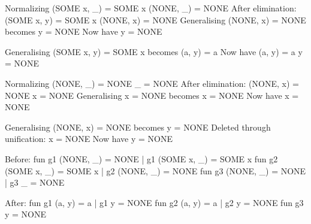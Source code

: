 \begin{example}[]
\begin{narrow}{-3em}{0em}
\begin{multicols}{2}
\begin{sml}
Normalizing
  (SOME x, _) = SOME x
  (NONE, _) = NONE
After elimination:
  (SOME x, y) = SOME x
  (NONE, x) = NONE
Generalising
  (NONE, x) = NONE
becomes
  y = NONE
Now have
  y = NONE

Generalising
  (SOME x, y) = SOME x
becomes
  (a, y) = a
Now have
  (a, y) = a
  y = NONE

Normalizing
  (NONE, _) = NONE
  _ = NONE
After elimination:
  (NONE, x) = NONE
  x = NONE
Generalising
  x = NONE
becomes
  x = NONE
Now have
  x = NONE

Generalising
  (NONE, x) = NONE
becomes
  y = NONE
Deleted through unification:
  x = NONE
Now have
  y = NONE

Before:
fun g1 (NONE, _) = NONE
  | g1 (SOME x, _) = SOME x
fun g2 (SOME x, _) = SOME x
  | g2 (NONE, _) = NONE
fun g3 (NONE, _) = NONE
  | g3 _ = NONE

After:
fun g1 (a, y) = a
  | g1 y = NONE
fun g2 (a, y) = a
  | g2 y = NONE
fun g3 y = NONE
      \end{sml}
    \end{multicols}
  \end{narrow}
\end{example}

